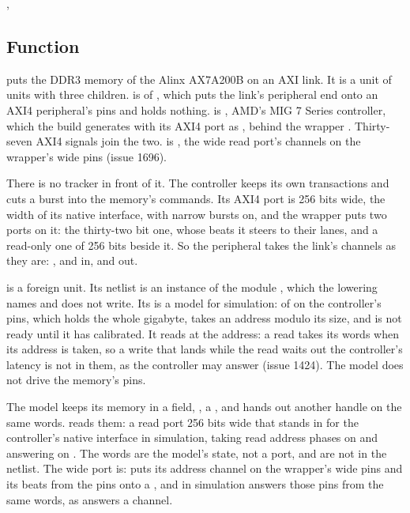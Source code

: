 
%
{, }

\subsection*{Function}

 puts the DDR3 memory of the Alinx AX7A200B on an AXI
link. It is a unit of units with three children.  is
 of , which puts the
link's peripheral end onto an AXI4 peripheral's pins and holds
nothing.  is , AMD's MIG 7 Series controller,
which the build generates with its AXI4 port as
, behind the wrapper
. Thirty-seven AXI4 signals join the two.
 is , the wide read port's channels on the
wrapper's wide pins (issue 1696).

There is no tracker in front of it. The controller keeps its own
transactions and cuts a burst into the memory's commands. Its AXI4
port is 256 bits wide, the width of its native interface, with narrow
bursts on, and the wrapper puts two ports on it: the thirty-two bit
one, whose beats it steers to their lanes, and a read-only one of 256
bits beside it. So the peripheral takes the link's channels as they
are: ,  and  in,  and  out.

 is a foreign unit. Its netlist is an instance of the
module , which the lowering names and does not write.
Its  is a model for simulation:  of
 on the controller's pins, which holds the whole
gigabyte, takes an address modulo its size, and is not ready until it
has calibrated. It reads at the address: a read takes its words when
its address is taken, so a write that lands while the read waits out
the controller's latency is not in them, as the controller may answer
(issue 1424). The model does not drive the memory's pins.

The model keeps its memory in a field, , a
, and  hands out another handle
on the same words.  reads them: a read
port 256 bits wide that stands in for the controller's native
interface in simulation, taking read address phases on
 and answering on .
The words are the model's state, not a port, and are not in the
netlist. The wide port is:  puts its address channel
on the wrapper's wide  pins and its beats from the 
pins onto a , and in simulation
 answers those pins from the same
words, as  answers a channel.

